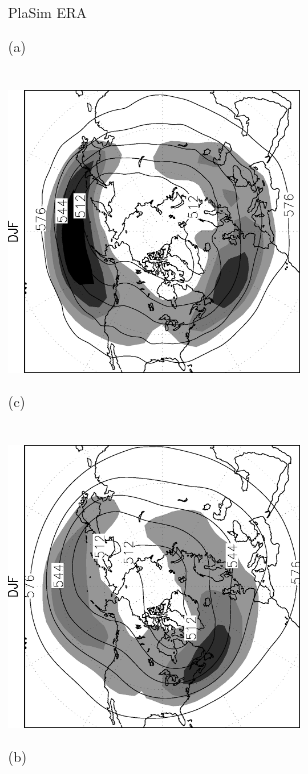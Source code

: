 \documentclass[12pt,a4paper,twoside,openright,headinclude,liststotoc,bibtotoc]{scrreprt}
\begin{document}
\begin{figure}[c]
\hspace{3.1cm}PlaSim \vspace{-0.1cm}\hspace{7.3cm} ERA \\
\parbox{8.5cm}{\hspace{0.02cm}\begin{scriptsize}(a)\end{scriptsize} \vspace{-0.3cm} \\
\includegraphics[height=7.5cm,angle=-90]
{eps/NHz500StdbpDJF.eps}
}
\parbox{8.5cm}{\hspace{0.02cm}\begin{scriptsize}(c)\end{scriptsize} \vspace{-0.3cm} \\
\includegraphics[height=7.5cm,angle=-90]
{eps/NHt21z500StdbpDJF.eps}
}
\parbox{8.5cm}{\hspace{0.02cm}\begin{scriptsize}(b)\end{scriptsize} \vspace{-0.3cm} \\ 
}
\end{figure}
\end{document}
